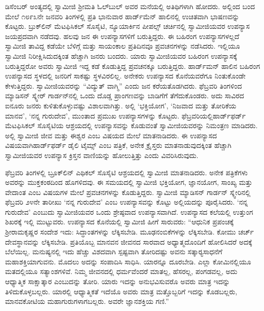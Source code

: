  ಡಿಸೆಂಬರ್ ಅಂತ್ಯದಲ್ಲಿ ಸ್ವಾಮೀಜಿ ಶ‍್ರೀಮತಿ ಓಲ್‍ಬುಲ್ ಅವರ ಮನೆಯಲ್ಲಿ ಅತಿಥಿಗಳಾಗಿ ಹೋದರು. ಅಲ್ಲಿಂದ ಬಂದ ಮೇಲೆ ೧೮೯೩ನೇ ಜನವರಿ ತಿಂಗಳಲ್ಲಿ ಪ್ರತಿ ಭಾನುವಾರ ಹಾರ್ಡ್‍ಮೆನ್ ಹಾಲಿನಲ್ಲಿ ಉಚಿತವಾಗಿ ಭಾಷಣವನ್ನು ಕೊಟ್ಟರು. ಬ್ರುಕ್‍ಲಿನ್ ಮೆಟಫಿಸಿಕಲ್ ಸೊಸೈಟಿ, ನ್ಯೂಯಾರ್ಕಿನ ಪೀಪಲ್ಸ್ ಚರ್ಚಿನಲ್ಲಿ ಸ್ವಾಮೀಜಿಯವರ ಉಪನ್ಯಾಸ ಜಯಪ್ರದವಾಗಿ ನಡೆದವು. ಹಲವು ಜನ ಈ ಉಪನ್ಯಾಸಗಳಿಗೆ ಬರುತ್ತಿದ್ದರು. ಈ ಬಹಿರಂಗ ಉಪನ್ಯಾಸಗಳಲ್ಲದೆ ಸ್ವಾಮೀಜಿ ತಾವಿದ್ದ ಕಡೆಯೇ ಬೆಳಿಗ್ಗೆ ಮತ್ತು ಸಾಯಂಕಾಲ ಪ್ರತಿದಿನವೂ ಪ್ರವಚನಗಳನ್ನು ನಡೆಸಿದರು. ಇಲ್ಲಿಯೂ ಸ್ವಾಮೀಜಿ ನಿರೀಕ್ಷಿಸಿದುದಕ್ಕಿಂತ ಹೆಚ್ಚಾಗಿ ಜನರು ಬಂದರು. ಯಾರು ಸ್ವಾಮೀಜಿಯವರ ಬಹಿರಂಗ ಉಪನ್ಯಾಸಕ್ಕೆ ಬರುತ್ತಿದ್ದರೋ ಅವರು ಸ್ವಾಮೀಜಿ ಇದ್ದ ಕಡೆ ಕೊಡುತ್ತಿದ್ದ ಪ್ರವಚನಕ್ಕೂ ಬರುತ್ತಿದ್ದರು. ಹಾರ್ಡ್‍ಮನ್ ಹಾಲಿನ ಬಹಿರಂಗ ಉಪನ್ಯಾಸದ ಸ್ಥಳದಲ್ಲಿ ಜನರಿಗೆ ಸಾಕಷ್ಟು ಸ್ಥಳವಿರಲಿಲ್ಲ. ಅನೇಕರು ಉಪನ್ಯಾಸದ ಕೊನೆಯವರೆಗೂ ನಿಂತುಕೊಂಡೇ ಕೇಳುತ್ತಿದ್ದರು. ಸ್ವಾಮೀಜಿಯವರನ್ನು “ವಿದ್ಯುತ್ ವಾಗ್ಮಿ” ಎಂದು ಜನ ಕರೆಯತೊಡಗಿದರು. ಫೆಬ್ರವರಿ ತಿಂಗಳಿಂದ ಮ್ಯಾಡಿಸನ್ ಸ್ಕ್ವೇರ್ ಗಾರ್ಡನ್‍ನಲ್ಲಿ ಒಂದು ದೊಡ್ಡ ಪ್ರಾಂಗಣವನ್ನು ಬಾಡಿಗೆಗೆ ತೆಗೆದುಕೊಂಡರು. ಅದು ಸಾವಿರದ ಐನೂರು ಜನರು ಕುಳಿತುಕೊಳ್ಳುವಷ್ಟು ವಿಶಾಲವಾಗಿತ್ತು. ಅಲ್ಲಿ ‘ಭಕ್ತಿಯೋಗ’, ‘ನಿಜವಾದ ಮತ್ತು ತೋರಿಕೆಯ ಮಾನವ’, ‘ನನ್ನ ಗುರುದೇವ’, ಮುಂತಾದ ಪ್ರಮುಖ ಉಪನ್ಯಾಸಗಳನ್ನು ಕೊಟ್ಟರು. ಫೆಬ್ರವರಿಯಲ್ಲಿ\break ಹಾರ್ಡ್‍ಫರ್ಡ್ ಮೆಟಫಿಸಿಕಲ್ ಸೊಸೈಟಿಯ ಆಶ್ರಯದಲ್ಲಿ ಉಪನ್ಯಾಸವನ್ನು ಕೊಡುವಂತೆ ಸ್ವಾಮೀಜಿಯವರನ್ನು ನಿಮಂತ್ರಣ ಮಾಡಿದರು. ಅಲ್ಲಿ ಸ್ವಾಮೀಜಿ ಜೀವ ಮತ್ತು ಈಶ್ವರ ಎಂಬ ವಿಷಯದ ಮೇಲೆ ಮಾತನಾಡಿದರು. ಈ ಉಪನ್ಯಾಸದ ವಿಷಯವಾಗಿ\break ಹಾರ್ಡ್‍ಫರ್ಡ್ ಡೈಲಿ ಟೈಮ್ಸ್ ಎಂಬ ಪತ್ರಿಕೆ, ಅನೇಕ ಕ್ರೈಸ್ತರು ಮಾತನಾಡುವುದಕ್ಕಿಂತ ಹೆಚ್ಚಾಗಿ ಸ್ವಾಮೀಜಿಯವರ ಉಪನ್ಯಾಸ ಕ್ರಿಸ್ತನ ವಾಣಿಯನ್ನು ಹೋಲುತ್ತಿತ್ತು ಎಂದು ವಿವರಿಸಿರುವುದು. 

\vskip 3pt

 ಫೆಬ್ರವರಿ ತಿಂಗಳಲ್ಲಿ ಬ್ರೂಕ್‍ಲಿನ್ ಎಥಿಕಲ್ ಸೊಸೈಟಿ ಆಶ್ರಯದಲ್ಲಿ ಸ್ವಾಮೀಜಿ ಮಾತನಾಡಿದರು. ಅನೇಕ ಪತ್ರಿಕೆಗಳು ಅವರನ್ನು ಮುಕ್ತಕಂಠದಿಂದ ಹೊಗಳಿದವು. ಈ ಸಮಯದಲ್ಲಿ ಸ್ವಾಮೀಜಿ ಭಕ್ತಿಯೋಗ, ಜ್ಞಾನಯೋಗ, ಸಾಂಖ್ಯ ಮತ್ತು ವೇದಾಂತ ಎಂಬ ವಿಷಯಗಳ ಮೇಲೆ ಪ್ರವಚನಗಳನ್ನು ಕೊಡುತ್ತಿದ್ದರು. ಸ್ವಾಮೀಜಿ ಮ್ಯಾಡಿಸನ್ ಗಾರ್ಡನ್ ಸ್ಕ್ವೇರಿನಲ್ಲಿ ಫೆಬ್ರವರಿ ೨೪ನೇ ತಾರೀಖು ‘ನನ್ನ ಗುರುದೇವ’ ಎಂಬ ಉಪನ್ಯಾಸವನ್ನು ಕೊಟ್ಟು ಅಲ್ಲಿಯದನ್ನು ಪೂರೈಸಿದರು. ‘ನನ್ನ ಗುರುದೇವ’ ಎಂಬುದು ಸ್ವಾಮೀಜಿಯವರ ಒಂದು ಶ್ರೇಷ್ಠವಾದ ಉಪನ್ಯಾಸವಾಗಿದೆ. ಉಪನ್ಯಾಸದ ಕಲೆಯಲ್ಲಿ ಉತ್ತುಂಗ ಶಿಖರಕ್ಕೆ ಇಲ್ಲಿ ಮುಟ್ಟುವರು. ಉಪನ್ಯಾಸದ ಕೊನೆಯಲ್ಲಿ ಸ್ವಾಮೀಜಿ ಹೀಗೆ ಸಾರುವರು: “ಆಧುನಿಕ ಪ್ರಪಂಚಕ್ಕೆ ಶ‍್ರೀರಾಮಕೃಷ್ಣರ ಸಂದೇಶ ಇದು: ಸಿದ್ಧಾಂತಗಳನ್ನು ಲೆಕ್ಕಿಸಬೇಡಿ. ಮೂಢನಂಬಿಕೆಗಳನ್ನು ಲೆಕ್ಕಿಸಬೇಡಿ. ಕೋಮು ಚರ್ಚ್ ದೇವಸ್ಥಾನವನ್ನು ಲೆಕ್ಕಿಸಬೇಡಿ. ಪ್ರತಿಯೊಬ್ಬ ಮಾನವನ ಜೀವನದ ಸಾರವಾದ ಅಧ್ಯಾತ್ಮದೊಂದಿಗೆ ಹೋಲಿಸಿದರೆ ಅದಕ್ಕೆ ಬೆಲೆಯಿಲ್ಲ. ಮನುಷ್ಯನಲ್ಲಿ ಇದು ಹೆಚ್ಚು ವಿಶದವಾಗಿ ಸ್ಪಷ್ಟವಾಗಿ ತೋರಿದಷ್ಟು ಅವನು ಸತ್ಕಾರ‍್ಯಸಾಧನೆಗೆ ಮಹಾಶಕ್ತಿಯಾಗುವನು. ಮೊದಲು ಅದನ್ನು ಸಂಪಾದಿಸಿ ಸಾಧಿಸಿ. ಯಾರನ್ನೂ ದೂರಬೇಡಿ. ಎಲ್ಲಾ ಕೋಮಿನಲ್ಲಿಯೂ ಮತದಲ್ಲಿಯೂ ಸತ್ಯಾಂಶಗಳಿವೆ. ನಿಮ್ಮ ಜೀವನದಲ್ಲಿ ಧರ್ಮವೆಂದರೆ ಮಾತಲ್ಲ, ಹೆಸರಲ್ಲ, ಪಂಗಡವಲ್ಲ, ಅದು ಆಧ್ಯಾತ್ಮಿಕ ಸಾಕ್ಷಾತ್ಕಾರ ಎಂಬುದನ್ನು ತೋರಿ. ಯಾರು ಇದನ್ನು ಅನುಭವಿಸುವರೊ ಅವರು ಮಾತ್ರ ಇದನ್ನು ತಿಳಿದುಕೊಳ್ಳಬಲ್ಲರು. ಯಾರಲ್ಲಿ ಆಧ್ಯಾತ್ಮಿಕತೆ ಇದೆಯೊ ಅವರು ಮಾತ್ರ ಮತ್ತೊಬ್ಬರಿಗೆ ಇದನ್ನು ಕೊಡಬಲ್ಲರು, ಮಾನವಕೋಟಿಯ ಮಹಾಗುರುಗಳಾಗಬಲ್ಲರು. ಅವರೇ ಜ್ಞಾನಶಕ್ತಿಯ ಗಣಿ.” 

